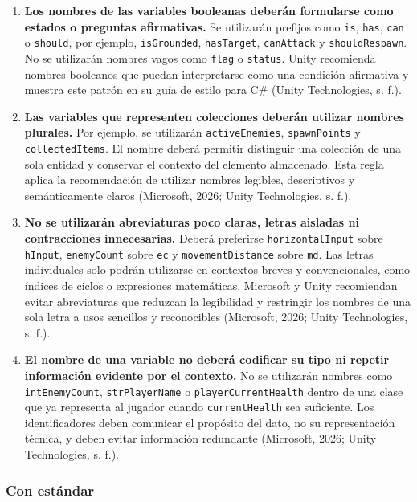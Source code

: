 \begin{enumerate}
  \item \textbf{Los nombres de las variables booleanas deberán formularse como estados o preguntas afirmativas.} Se utilizarán prefijos como \texttt{is}, \texttt{has}, \texttt{can} o \texttt{should}, por ejemplo, \texttt{isGrounded}, \texttt{hasTarget}, \texttt{canAttack} y \texttt{shouldRespawn}. No se utilizarán nombres vagos como \texttt{flag} o \texttt{status}. Unity recomienda nombres booleanos que puedan interpretarse como una condición afirmativa y muestra este patrón en su guía de estilo para C\# (Unity Technologies, s. f.).

  \item \textbf{Las variables que representen colecciones deberán utilizar nombres plurales.} Por ejemplo, se utilizarán \texttt{activeEnemies}, \texttt{spawnPoints} y \texttt{collectedItems}. El nombre deberá permitir distinguir una colección de una sola entidad y conservar el contexto del elemento almacenado. Esta regla aplica la recomendación de utilizar nombres legibles, descriptivos y semánticamente claros (Microsoft, 2026; Unity Technologies, s. f.).

  \item \textbf{No se utilizarán abreviaturas poco claras, letras aisladas ni contracciones innecesarias.} Deberá preferirse \texttt{horizontalInput} sobre \texttt{hInput}, \texttt{enemyCount} sobre \texttt{ec} y \texttt{movementDistance} sobre \texttt{md}. Las letras individuales solo podrán utilizarse en contextos breves y convencionales, como índices de ciclos o expresiones matemáticas. Microsoft y Unity recomiendan evitar abreviaturas que reduzcan la legibilidad y restringir los nombres de una sola letra a usos sencillos y reconocibles (Microsoft, 2026; Unity Technologies, s. f.).

  \item \textbf{El nombre de una variable no deberá codificar su tipo ni repetir información evidente por el contexto.} No se utilizarán nombres como \texttt{intEnemyCount}, \texttt{strPlayerName} o \texttt{playerCurrentHealth} dentro de una clase que ya representa al jugador cuando \texttt{currentHealth} sea suficiente. Los identificadores deben comunicar el propósito del dato, no su representación técnica, y deben evitar información redundante (Microsoft, 2026; Unity Technologies, s. f.).
\end{enumerate}

\subsubsection{Con estándar}

